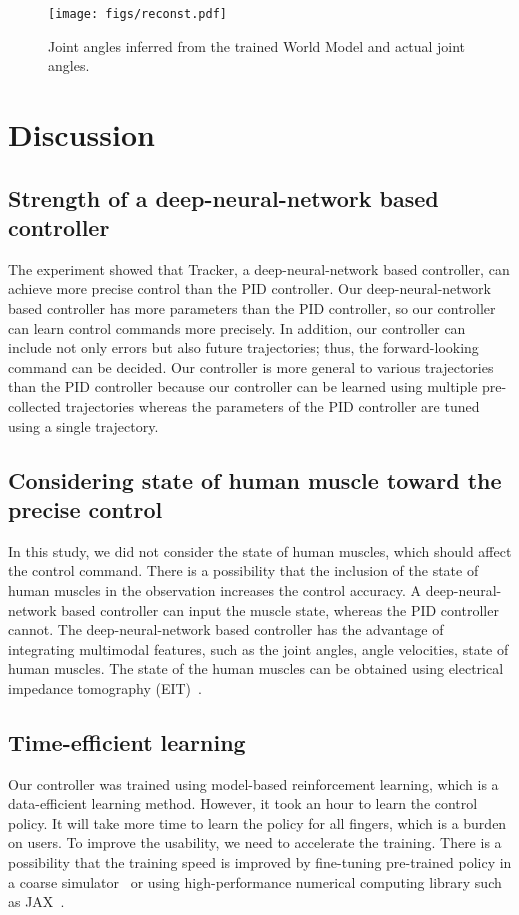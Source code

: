 \documentclass[letterpaper, 10 pt, conference]{ieeeconf}  %
\begin{document}
\begin{figure}[tb]
\begin{center}
\texttt{[image: figs/reconst.pdf]}
    \caption{Joint angles inferred from the trained World Model 
    and actual joint angles.}
    \label{fig:world}
\end{center}
\end{figure}



\section{Discussion}
\subsection{Strength of a deep-neural-network based controller}
The experiment showed that Tracker, a deep-neural-network based controller, can achieve more precise control than the PID controller. Our deep-neural-network based controller has more parameters than the PID controller, so our controller can learn control commands more precisely. In addition, our controller can include not only errors but also future trajectories; thus, the forward-looking command can be decided. Our controller is more general to various trajectories than the PID controller because our controller can be learned using multiple pre-collected trajectories whereas the parameters of the PID controller are tuned using a single trajectory. 

\subsection{Considering state of human muscle toward the precise control}
In this study, we did not consider the state of human muscles, which should affect the control command. There is a possibility that the inclusion of the state of human muscles in the observation increases the control accuracy. A deep-neural-network based controller can input the muscle state, whereas the PID controller cannot. The deep-neural-network based controller has the advantage of integrating multimodal features, such as the joint angles, angle velocities, state of human muscles. The state of the human muscles can be obtained using electrical impedance tomography (EIT)~\cite{zhu2022muscle}.

\subsection{Time-efficient learning}
Our controller was trained using model-based reinforcement learning, which is a data-efficient learning method. However, it took an hour to learn the control policy. It will take more time to learn the policy for all fingers, which is a burden on users. To improve the usability, we need to accelerate the training. There is a possibility that the training speed is improved by fine-tuning pre-trained policy in a coarse simulator~\cite{truong2022rethinking} or using high-performance numerical computing library such as JAX~\cite{jax2018github, smith2022walk}. 
\end{document}
